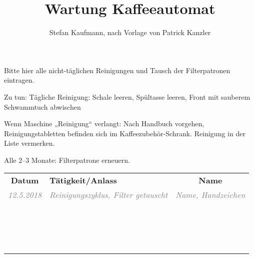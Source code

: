 \documentclass{\basedir/tph-document}
\title{Wartung Kaffeeautomat}
\author{Stefan Kaufmann, nach Vorlage von Patrick Kanzler}
\newcommand{\thickhline}{\noalign{\hrule height 2pt}}
\begin{document}
Bitte hier alle nicht-täglichen Reinigungen und Tausch der Filterpatronen eintragen.

Zu tun: Tägliche Reinigung: Schale leeren, Spültasse leeren, Front mit sauberem Schwammtuch abwischen

Wenn Maschine „Reinigung“ verlangt: Nach Handbuch vorgehen, Reinigungstabletten befinden sich im Kaffeezubehör-Schrank. Reinigung in der Liste vermerken.

Alle 2–3 Monate: Filterpatrone erneuern.

\newcommand{\bsp}[1]{\textcolor{gray}{\itshape #1}}
\newcommand{\beispielzeile}[5]{\bsp{#2} & \bsp{#3} & \bsp{#4} \\ \hline}
\newcommand{\leerzeile}{\vbox{\vspace{2.4em}} & & \\ \hline}
\vspace{-.4em}
\begin{tabularx}{\textwidth}{|c|X|c|} \hline
\bfseries Datum      &  \bfseries Tätigkeit/Anlass  & \bfseries Name \\\thickhline
\beispielzeile{BSP}{12.5.2018}{ Reinigungszyklus, Filter getauscht }{Name, Handzeichen}
\leerzeile
\leerzeile
\leerzeile
\leerzeile
\leerzeile
\leerzeile
\leerzeile
\leerzeile
\leerzeile
\leerzeile
\leerzeile
\leerzeile
\leerzeile
\leerzeile
\leerzeile
\leerzeile
\leerzeile
\leerzeile
\end{tabularx}
\end{document}
